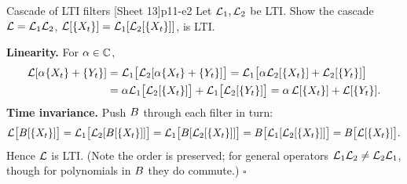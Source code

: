 \begin{exercise}{Cascade of LTI filters \quad\textnormal{[Sheet 13]}}{p11-e2}
Let $\mathcal{L}_1,\mathcal{L}_2$ be LTI. Show the cascade
$\mathcal{L}=\mathcal{L}_1\mathcal{L}_2$, $\mathcal{L}[\{X_t\}]=\mathcal{L}_1[\mathcal{L}_2[\{X_t\}]]$, is LTI.
\end{exercise}
\begin{solution}
\textbf{Linearity.} For $\alpha\in\mathbb{C}$,
\[
\begin{aligned}
\mathcal{L}[\alpha\{X_t\}+\{Y_t\}]
&=\mathcal{L}_1\big[\mathcal{L}_2[\alpha\{X_t\}+\{Y_t\}]\big]
 =\mathcal{L}_1\big[\alpha\mathcal{L}_2[\{X_t\}]+\mathcal{L}_2[\{Y_t\}]\big]\\
&=\alpha\mathcal{L}_1\big[\mathcal{L}_2[\{X_t\}]\big]+\mathcal{L}_1\big[\mathcal{L}_2[\{Y_t\}]\big]
 =\alpha\,\mathcal{L}[\{X_t\}]+\mathcal{L}[\{Y_t\}].
\end{aligned}
\]
\textbf{Time invariance.} Push $B$ through each filter in turn:
\[
\mathcal{L}\big[B[\{X_t\}]\big]
=\mathcal{L}_1\big[\mathcal{L}_2[B[\{X_t\}]]\big]
=\mathcal{L}_1\big[B[\mathcal{L}_2[\{X_t\}]]\big]
=B\big[\mathcal{L}_1[\mathcal{L}_2[\{X_t\}]]\big]
=B\big[\mathcal{L}[\{X_t\}]\big].
\]
Hence $\mathcal{L}$ is LTI. (Note the order is preserved; for general operators
$\mathcal{L}_1\mathcal{L}_2\ne\mathcal{L}_2\mathcal{L}_1$, though for polynomials in $B$ they do
commute.) \hfill$\square$
\end{solution}

